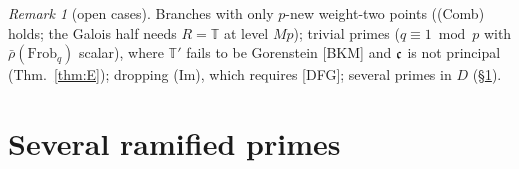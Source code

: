 \documentclass[11pt]{amsart}
\theoremstyle{plain}
\theoremstyle{definition}
\theoremstyle{remark}
\newtheorem{remark}[theorem]{Remark}
\newcommand{\T}{\mathbb{T}}\newcommand{\m}{\mathfrak{m}}\newcommand{\cT}{\mathcal{T}}\newcommand{\cX}{\mathcal{X}}
\begin{document}
\begin{remark}[open cases]
Branches with only $p$-new weight-two points ((Comb) holds; the Galois half needs $R=\T$ at level $Mp$); trivial primes ($q\equiv1\bmod p$ with $\bar\rho(\mathrm{Frob}_q)$ scalar), where $\T'$ fails to be Gorenstein [BKM] and $\mathfrak{c}$ is not principal (Thm.~\ref{thm:E}); dropping (Im), which requires [DFG]; several primes in $D$ (\S\ref{sec:general}).
\end{remark}

\section{Several ramified primes}\label{sec:general}
\end{document}
